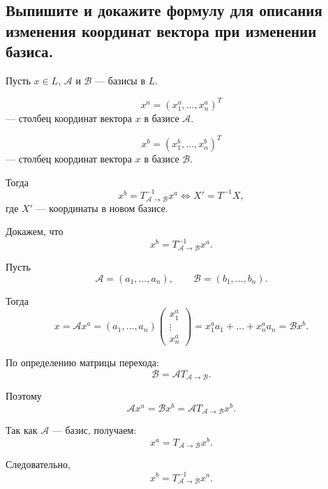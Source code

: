 \subsection{Выпишите и докажите формулу для описания изменения координат вектора при изменении базиса.}

\begin{theorem}
    Пусть $x \in L$, $\mathcal{A}$ и $\mathcal{B}$ --- базисы в $L$.
    
    \[
        x^a = (x_1^a, \ldots, x_n^a)^T
    \]
    --- столбец координат вектора $x$ в базисе $\mathcal{A}$.
    
    \[
        x^b = (x_1^b, \ldots, x_n^b)^T
    \]
    --- столбец координат вектора $x$ в базисе $\mathcal{B}$.
    
    Тогда
    \[
        x^b = T_{\mathcal{A} \to \mathcal{B}}^{-1}x^a
        \Longleftrightarrow
        X' = T^{-1}X,
    \]
    где $X'$ --- координаты в новом базисе.
\end{theorem}

\begin{Proof}
    Докажем, что
    \[
        x^b = T_{\mathcal{A} \to \mathcal{B}}^{-1}x^a.
    \]
    
    Пусть
    \[
        \mathcal{A} = (a_1, \ldots, a_n),
        \qquad
        \mathcal{B} = (b_1, \ldots, b_n).
    \]
    
    Тогда
    \[
        x
        =
        \mathcal{A}x^a
        =
        (a_1, \ldots, a_n)
        \begin{pmatrix}
            x_1^a \\
            \vdots \\
            x_n^a
        \end{pmatrix}
        =
        x_1^a a_1 + \ldots + x_n^a a_n
        =
        \mathcal{B}x^b.
    \]
    
    По определению матрицы перехода:
    \[
        \mathcal{B}
        =
        \mathcal{A}T_{\mathcal{A} \to \mathcal{B}}.
    \]
    
    Поэтому
    \[
        \mathcal{A}x^a
        =
        \mathcal{B}x^b
        =
        \mathcal{A}T_{\mathcal{A} \to \mathcal{B}}x^b.
    \]
    
    Так как $\mathcal{A}$ --- базис, получаем:
    \[
        x^a
        =
        T_{\mathcal{A} \to \mathcal{B}}x^b.
    \]
    
    Следовательно,
    \[
        x^b
        =
        T_{\mathcal{A} \to \mathcal{B}}^{-1}x^a.
    \]
\end{Proof}

